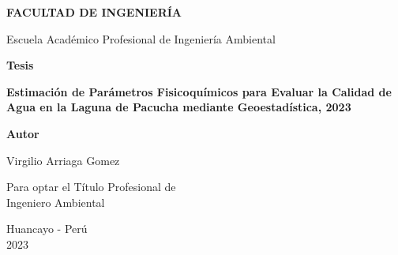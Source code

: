 \begin{titlepage}
    \begin{center}
        {\scshape\Large \textbf{FACULTAD DE INGENIERÍA}\par}
        \vspace{0.2cm} %
        {\Large Escuela Académico Profesional de Ingeniería Ambiental\par}
        \vspace{0.5cm} %
        {\LARGE\bfseries Tesis\par}
        \vspace{0.4cm} %
        {\large\bfseries Estimación de Parámetros Fisicoquímicos para Evaluar la Calidad de Agua en la Laguna de Pacucha mediante Geoestadística, 2023\par}
        \vspace{1.2cm} %
        {\Large\bfseries Autor\par}
        \vspace{-5pt} %
        {\Large Virgilio Arriaga Gomez\par}
        \vspace{10pt} %
        {\Large Para optar el Título Profesional de \\[-3pt]Ingeniero Ambiental\par}
        \vspace{15pt} %
        {\Large Huancayo - Perú \\[-3pt]2023\par}
    \end{center}
    
    \vfill %
    
    \vspace*{0mm} %
    \noindent %
    \makebox[\linewidth]{\rule{\paperwidth}{3mm}}\\[1mm] %
    \makebox[\linewidth]{\rule{\paperwidth}{3mm}}\\[1mm] %
    \makebox[\linewidth]{\rule{\paperwidth}{3mm}} %

\end{titlepage}

